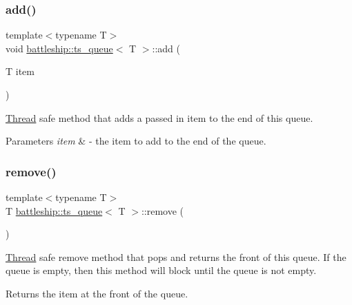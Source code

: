 \subsubsection{\texorpdfstring{add()}{add()}}
{\footnotesize\ttfamily template$<$typename T$>$ \\
void \hyperlink{classbattleship_1_1ts__queue}{battleship\+::ts\+\_\+queue}$<$ T $>$\+::add (\begin{DoxyParamCaption}\item[{T}]{item }\end{DoxyParamCaption})\hspace{0.3cm}{\ttfamily [inline]}}

\hyperlink{classThread}{Thread} safe method that adds a passed in item to the end of this queue.


\begin{DoxyParams}{Parameters}
{\em item} & -\/ the item to add to the end of the queue. \\
\hline
\end{DoxyParams}
\mbox{\label{classbattleship_1_1ts__queue_aa6ec6739ad7f1768068cb1f7d5957b2f}} 
\subsubsection{\texorpdfstring{remove()}{remove()}}
{\footnotesize\ttfamily template$<$typename T$>$ \\
T \hyperlink{classbattleship_1_1ts__queue}{battleship\+::ts\+\_\+queue}$<$ T $>$\+::remove (\begin{DoxyParamCaption}{ }\end{DoxyParamCaption})\hspace{0.3cm}{\ttfamily [inline]}}

\hyperlink{classThread}{Thread} safe remove method that pops and returns the front of this queue. If the queue is empty, then this method will block until the queue is not empty.

\begin{DoxyReturn}{Returns}
the item at the front of the queue. 
\end{DoxyReturn}
\mbox{\label{classbattleship_1_1ts__queue_a45ee4b66d4e5da270559887775659c6f}} 

